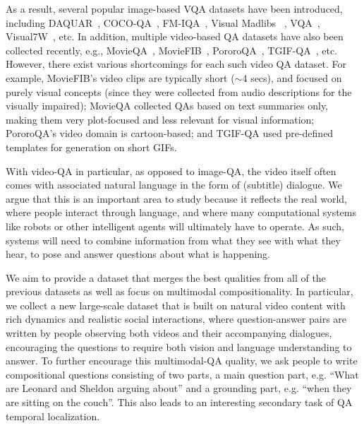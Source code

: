 \documentclass[11pt,a4paper]{article}
\begin{document}
As a result, several popular image-based VQA datasets have been introduced, including DAQUAR~\cite{malinowski2014multi}, COCO-QA~\cite{ren2015exploring}, FM-IQA~\cite{gao2015you}, Visual Madlibs~
\cite{Yu2015VisualMF}, VQA~\cite{Antol2015VQAVQ}, Visual7W~\cite{zhu2016visual7w}, etc.
In addition, multiple video-based QA datasets have also been collected recently, e.g., MovieQA~\cite{Tapaswi2016MovieQAUS}, MovieFIB~\cite{maharaj2017dataset}, PororoQA~\cite{Kim2017DeepStoryVS}, TGIF-QA~\cite{Jang2017TGIFQATS}, etc.
However, there exist various shortcomings for each such video QA dataset.
For example, MovieFIB's video clips are typically short ($\sim$4 secs), and focused on purely visual concepts (since they were collected from audio descriptions for the visually impaired); MovieQA collected QAs based on text summaries only, making them very plot-focused and less relevant for visual information; PororoQA's video domain is cartoon-based; and TGIF-QA used pre-defined templates for generation on short GIFs. 



With video-QA in particular, as opposed to image-QA, the video itself often comes with associated natural language in the form of (subtitle) dialogue. We argue that this is an important area to study because it reflects the real world, where people interact through language, and where many computational systems like robots or other intelligent agents will ultimately have to operate. As such, systems will need to combine information from what they see with what they hear, to pose and answer questions about what is happening.


We aim to provide a dataset that merges the best qualities from all of the previous datasets as well as focus on multimodal compositionality. In particular, we collect a new large-scale dataset that is built on natural video content with rich dynamics and realistic social interactions, where question-answer pairs are written by people observing both videos and their accompanying dialogues, encouraging the questions to require both vision and language understanding to answer. To further encourage this multimodal-QA quality, we ask people to write compositional questions consisting of two parts, a main question part, e.g. ``What are Leonard and Sheldon arguing about'' and a grounding part, e.g. ``when they are sitting on the couch''. This also leads to an interesting secondary task of QA temporal localization.
\end{document}
